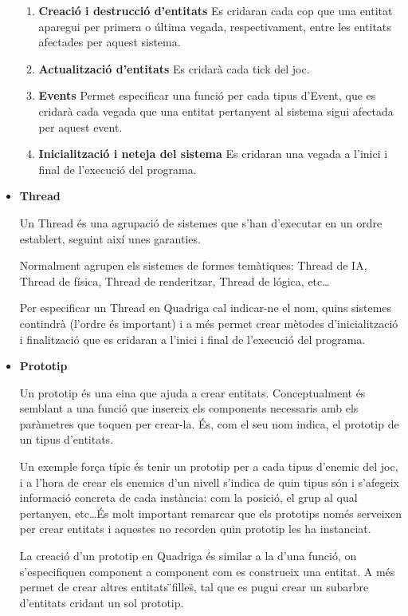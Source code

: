 \begin{itemize}
      \begin{enumerate}
        \item {\bf Creació i destrucció d'entitats} Es cridaran cada cop que una entitat aparegui per primera o última vegada, respectivament, entre les entitats afectades per aquest sistema.
        \item {\bf Actualització d'entitats} Es cridarà cada tick del joc.
        \item {\bf Events} Permet especificar una funció per cada tipus d'Event, que es cridarà cada vegada que una entitat pertanyent al sistema sigui afectada per aquest event.
        \item {\bf Inicialització i neteja del sistema} Es cridaran una vegada a l'inici i final de l'execució del programa.
      \end{enumerate}
      
    \item{\bf Thread}

      Un Thread és una agrupació de sistemes que s'han d'executar en un ordre establert, seguint així unes garanties.
      
      Normalment agrupen els sistemes de formes temàtiques: Thread de IA, Thread de física, Thread de renderitzar, Thread de lógica, etc\ldots
      
      Per especificar un Thread en Quadriga cal indicar-ne el nom, quins sistemes contindrà (l'ordre és important) i a més permet crear mètodes d'inicialització i finalització que es cridaran a l'inici i final de l'execució del programa.

    \item{\bf Prototip}

      Un prototip és una eina que ajuda a crear entitats. Conceptualment és semblant a una funció que insereix els components necessaris amb els paràmetres que toquen per crear-la. És, com el seu nom indica, el prototip de un tipus d'entitats.
      
      Un exemple força típic és tenir un prototip per a cada tipus d'enemic del joc, i a l'hora de crear els enemics d'un nivell s'indica de quin tipus són i s'afegeix informació concreta de cada instància: com la posició, el grup al qual pertanyen, etc\ldots És molt important remarcar que els prototips només serveixen per crear entitats i aquestes no recorden quin prototip les ha instanciat.
      
      La creació d'un prototip en Quadriga és similar a la d'una funció, on s'especifiquen component a component com es construeix una entitat. A més permet de crear altres entitats \"{}filles\"{}, tal que es pugui crear un subarbre d'entitats cridant un sol prototip.


\end{itemize}
